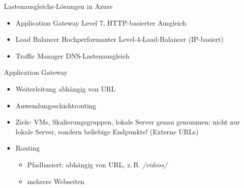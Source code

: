 
\begin{flashcard}[Definition]{Lastenausgleichs-Lösungen in Azure}
    \begin{itemize}
        \item Application Gateway\newline
            Level 7, HTTP-basierter Ausgleich
        \item Load Balancer\newline
            Hochperformanter Level-4-Load-Balancer (IP-basiert)
        \item Traffic Manager\newline
            DNS-Lastenausgleich
    \end{itemize}
\end{flashcard}   


\begin{flashcard}[Definition]{Application Gateway}
    \begin{itemize}
        \item Weiterleitung abhängig von URL
        \item Anwendungsschichtrouting
        \item Ziele: VMs, Skalierungsgruppen, lokale Server\newline
            genau genommen: nicht nur lokale Server, sondern beliebige Endpunkte! (Externe URLs)
        \item Routing
            \begin{itemize}
                \item Pfadbasiert:\newline
                    abhängig von URL, z.\,B. \emph{/videos/}
                \item mehrere Webseiten
            \end{itemize}

    \end{itemize}
\end{flashcard}   


